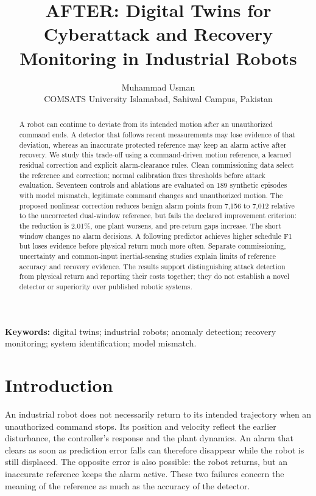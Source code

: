\documentclass[11pt]{article}
\title{AFTER: Digital Twins for Cyberattack and Recovery Monitoring in Industrial Robots}
\author{Muhammad Usman\\[4pt]\small COMSATS University Islamabad, Sahiwal Campus, Pakistan}
\date{}
\begin{document}
\maketitle
\begin{abstract}
A robot can continue to deviate from its intended motion after an unauthorized command ends. A detector that follows recent measurements may lose evidence of that deviation, whereas an inaccurate protected reference may keep an alarm active after recovery. We study this trade-off using a command-driven motion reference, a learned residual correction and explicit alarm-clearance rules. Clean commissioning data select the reference and correction; normal calibration fixes thresholds before attack evaluation. Seventeen controls and ablations are evaluated on 189 synthetic episodes with model mismatch, legitimate command changes and unauthorized motion. The proposed nonlinear correction reduces benign alarm points from 7,156 to 7,012 relative to the uncorrected dual-window reference, but fails the declared improvement criterion: the reduction is 2.01\%, one plant worsens, and pre-return gaps increase. The short window changes no alarm decisions. A following predictor achieves higher schedule F1 but loses evidence before physical return much more often. Separate commissioning, uncertainty and common-input inertial-sensing studies explain limits of reference accuracy and recovery evidence. The results support distinguishing attack detection from physical return and reporting their costs together; they do not establish a novel detector or superiority over published robotic systems.
\end{abstract}
\noindent\textbf{Keywords:} digital twins; industrial robots; anomaly detection; recovery monitoring; system identification; model mismatch.

\section{Introduction}
An industrial robot does not necessarily return to its intended trajectory when an unauthorized command stops. Its position and velocity reflect the earlier disturbance, the controller's response and the plant dynamics. An alarm that clears as soon as prediction error falls can therefore disappear while the robot is still displaced. The opposite error is also possible: the robot returns, but an inaccurate reference keeps the alarm active. These two failures concern the meaning of the reference as much as the accuracy of the detector.
\end{document}
